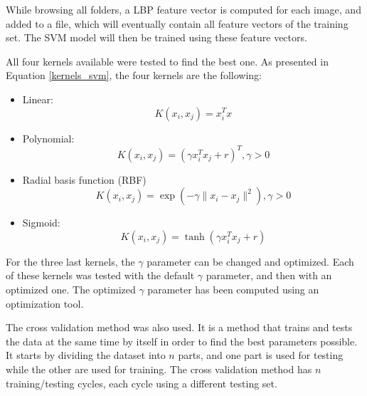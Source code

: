 \noindent While browsing all folders, a LBP feature vector is computed for each image, and added to a file, which will eventually contain all feature vectors of the training set. The SVM model will then be trained using these feature vectors.
\newline

\noindent All four kernels available were tested to find the best one. As presented in Equation \ref{kernels_svm}, the four kernels are the following:

\begin{itemize}
  \item Linear:
  \begin{equation}
K(x_i,x_j) = x_i^Tx
\end{equation}

  \item Polynomial:
  \begin{equation}
K(x_i,x_j) = (\gamma x_i^Tx_j + r)^T, \gamma > 0
\end{equation}

  \item Radial basis function (RBF)
  \begin{equation}
K(x_i,x_j) = \exp(-\gamma \| x_i - x_j \|^2), \gamma > 0
\end{equation}

  \item Sigmoid:
  \begin{equation}
K(x_i,x_j) = \tanh(\gamma x_i^T x_j + r)
	\end{equation}
\end{itemize}

\vspace{\baselineskip}
\noindent For the three last kernels, the $\gamma$ parameter can be changed and optimized. Each of these kernels was tested with the default $\gamma$ parameter, and then with an optimized one. The optimized $\gamma$ parameter has been computed using an optimization tool.
\newline

\noindent The cross validation method was also used. It is a method that trains and tests the data at the same time by itself in order to find the best parameters possible. It starts by dividing the dataset into $ n $ parts, and one part is used for testing while the other are used for training. The cross validation method has $n$ training/testing cycles, each cycle using a different testing set.  
\newline






